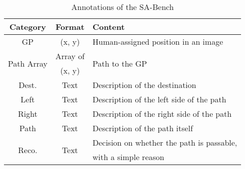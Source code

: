 \begin{table}[b]
\vspace{-5mm}
\caption{Annotations of the SA-Bench}
\vspace{-3mm}
\centering
\begin{tabular}{|c|c|l|}
\hline
\textbf{Category}&\textbf{Format}&\textbf{Content}\\
\hline
GP&(x, y)&Human-assigned position in an image\\
\hline
\multirow{2}{*}{Path Array}&Array of&\multirow{2}{*}{Path to the GP}\\
&(x, y)&\\
\hline
Dest.&Text&Description of the destination\\
\hline
Left&Text&Description of the left side of the path\\
\hline
Right&Text&Description of the right side of the path\\
\hline
Path&Text&Description of the path itself\\
\hline
\multirow{2}{*}{Reco.}&\multirow{2}{*}{Text}&Decision on whether the path is passable,\\
&& with a simple reason\\
\hline
\end{tabular}
\label{tab:benchmark}
\end{table}
